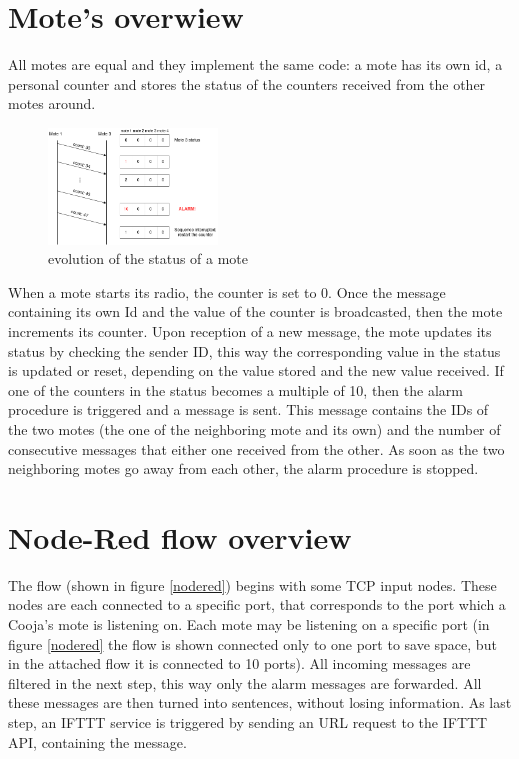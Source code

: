 \documentclass[11pt]{article}
\begin{document}
\section{Mote's overwiew}
All motes are equal and they implement the same code: \newline
a mote has its own id, a personal counter and stores the status of the counters received from the other motes around. \newline
\begin{figure}
  \begin{center}
    \includegraphics[width=0.40\textwidth]{status_update_diagram.png}
    \caption{evolution of the status of a mote}
  \end{center}
\end{figure}
When a mote starts its radio, the counter is set to 0. Once the message containing its own Id and the value of the counter is broadcasted, then the mote increments its counter. \newline
Upon reception of a new message, the mote updates its status by checking the sender ID, this way the corresponding value in the status is updated or reset, depending on the value stored and the new value received. \newline
If one of the counters in the status becomes a multiple of 10, then the alarm procedure is triggered and a message is sent. This message contains the IDs of the two motes (the one of the neighboring mote and its own) and the number of consecutive messages that either one received from the other. \newline
As soon as the two neighboring motes go away from each other, the alarm procedure is stopped.

\section{Node-Red flow overview}
The flow (shown in figure \ref{nodered}) begins with some TCP input nodes. These nodes are each connected to a specific port, that corresponds to the port which a Cooja's mote is listening on. Each mote may be listening on a specific port (in figure \ref{nodered} the flow is shown connected only to one port to save space, but in the attached flow it is connected to 10 ports). \newline %
All incoming messages are filtered in the next step, this way only the alarm messages are forwarded. All these messages are then turned into sentences, without losing information. \newline
As last step, an IFTTT service is triggered by sending an URL request to the IFTTT API, containing the message.
\end{document}
